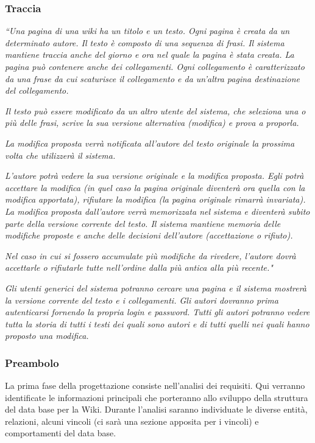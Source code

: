 


\subsubsection{Traccia}
\textit{“Una pagina di una wiki ha un titolo e un testo. Ogni pagina è creata da un determinato autore. Il
testo è composto di una sequenza di frasi. Il sistema mantiene traccia anche del giorno e ora nel quale la pagina è stata creata. La pagina può contenere anche dei collegamenti. Ogni collegamento è caratterizzato da una frase da cui scaturisce il collegamento e da un’altra pagina destinazione del collegamento.}\newline

\textit{Il testo può essere modificato da un altro utente del sistema, che seleziona una o più delle frasi, scrive la sua versione alternativa (modifica) e prova a proporla.}\newline

\textit{La modifica proposta verrà notificata all’autore del testo originale la prossima volta che utilizzerà il sistema.}\newline

\textit{L’autore potrà vedere la sua versione originale e la modifica proposta. Egli potrà accettare la modifica (in quel caso la pagina originale diventerà ora quella con la modifica apportata), rifiutare la modifica (la pagina originale rimarrà invariata). La modifica proposta dall’autore verrà memorizzata nel sistema e diventerà subito parte della versione corrente del testo. Il sistema mantiene memoria delle modifiche proposte e anche delle decisioni dell’autore (accettazione o rifiuto).}\newline

\textit{Nel caso in cui si fossero accumulate più modifiche da rivedere, l’autore dovrà accettarle o rifiutarle tutte nell’ordine dalla più antica alla più recente."}

\textit{Gli utenti generici del sistema potranno cercare una pagina e il sistema mostrerà la versione corrente del
testo e i collegamenti.
Gli autori dovranno prima autenticarsi fornendo la propria login e password. Tutti gli autori potranno vedere
tutta la storia di tutti i testi dei quali sono autori e di tutti quelli nei quali hanno proposto una modifica.}

\subsubsection{Preambolo}
La prima fase della progettazione consiste nell'analisi dei requisiti. Qui verranno identificate le informazioni principali che porteranno allo sviluppo della struttura del data base per la Wiki.
Durante l’analisi saranno individuate le diverse entità, relazioni, alcuni vincoli (ci sarà una sezione apposita per i vincoli) e comportamenti del data base.

